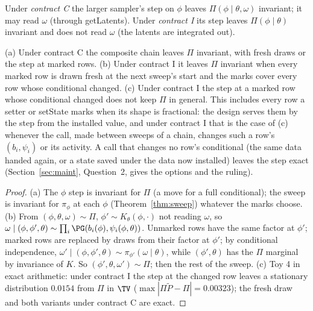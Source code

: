 \begin{definition}[Contracts]
Under \emph{contract C} the larger sampler's step on $\phi$ leaves $\Pi(\phi\mid\theta,\omega)$ invariant; it may
read $\omega$ (through getLatents). Under \emph{contract I} its step leaves $\Pi(\phi\mid\theta)$ invariant and
does not read $\omega$ (the latents are integrated out).
\end{definition}

\begin{theorem}\label{thm:setters}
(a) Under contract C the composite chain leaves $\Pi$ invariant, with fresh draws or the step at marked rows.
(b) Under contract I it leaves $\Pi$ invariant when every marked row is drawn fresh at the next sweep's start and
the marks cover every row whose conditional changed. (c) Under contract I the step at a marked row whose conditional changed does not keep
$\Pi$ in general. This includes every row a setter or setState marks when its shape is fractional: the design
serves them by the step from the installed value, and under contract I that is the case of (c) whenever the call,
made between sweeps of a chain, changes such a row's $(b_i,\psi_i)$ or its activity. A call that changes no row's
conditional (the same data handed again, or a state saved under the data now installed) leaves the step exact
(Section~\ref{sec:maint}, Question~2, gives the options and the ruling).
\end{theorem}
\begin{proof}
(a) The $\phi$ step is invariant for $\Pi$ (a move for a full conditional); the sweep is invariant for
$\pi_\phi$ at each $\phi$ (Theorem~\ref{thm:sweep}) whatever the marks choose. (b) From $(\phi,\theta,\omega)\sim
\Pi$, $\phi'\sim K_\theta(\phi,\cdot)$ not reading $\omega$, so $\omega\mid(\phi,\phi',\theta)\sim\prod_i\PG(b_i(
\phi),\psi_i(\phi,\theta))$. Unmarked rows have the same factor at $\phi'$; marked rows are replaced by draws from
their factor at $\phi'$; by conditional independence, $\omega'\mid(\phi,\phi',\theta)\sim\pi_{\phi'}(\omega\mid
\theta)$, while $(\phi',\theta)$ has the $\Pi$ marginal by invariance of $K$. So $(\phi',\theta,\omega')\sim\Pi$;
then the rest of the sweep. (c) Toy 4 in exact arithmetic: under contract I the step at the changed row leaves a
stationary distribution $0.0154$ from $\Pi$ in $\TV$ ($\max|\Pi\widetilde P-\Pi|=0.00323$); the fresh draw and
both variants under contract C are exact.
\end{proof}

